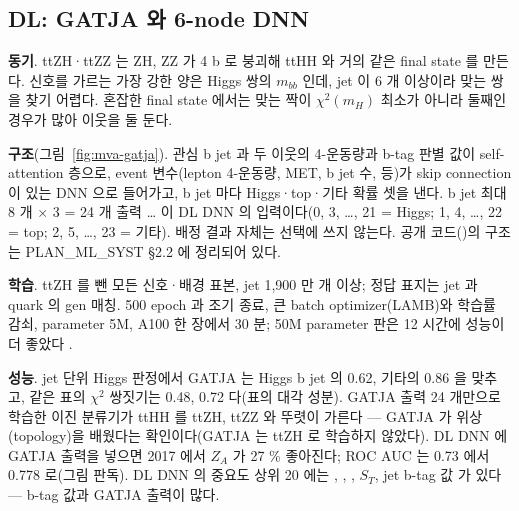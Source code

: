 \subsection{DL: GATJA 와 6-node DNN}\label{sec:mva-an-gatja}

\textbf{동기}. ttZH·ttZZ 는 ZH, ZZ 가 4 b 로 붕괴해 ttHH 와 거의 같은 final state 를 만든다. 신호를 가르는 가장 강한 양은 Higgs 쌍의
$m_{bb}$ 인데, jet 이 6 개 이상이라 맞는 쌍을 찾기 어렵다. 혼잡한 final state 에서는 맞는 짝이 $\chi^2(m_H)$ 최소가
아니라 둘째인 경우가 많아 이웃을 둘 둔다.

\textbf{구조}(그림~\ref{fig:mva-gatja}). 관심 b jet 과 두 이웃의 4-운동량과 b-tag 판별 값이 self-attention 층으로, event 변수(lepton 4-운동량, MET,
b jet 수, \HT 등)가 skip connection 이 있는 DNN 으로 들어가고, b jet 마다 Higgs·top·기타 확률 셋을 낸다.
b jet 최대 8 개 $\times$ 3 = 24 개 출력  …  이 DL DNN 의 입력이다(0, 3, …, 21 = Higgs; 1, 4, …, 22 = top;
2, 5, …, 23 = 기타). 배정 결과 자체는 선택에 쓰지 않는다.
공개 코드()의 구조는 PLAN\_ML\_SYST §2.2 에 정리되어 있다.

\textbf{학습}. ttZH 를 뺀 모든 신호·배경 표본, jet 1{,}900 만 개 이상; 정답 표지는 jet 과 quark 의 gen 매칭.
500 epoch 과 조기 종료, 큰 batch optimizer(LAMB)와 학습률 감쇠, parameter 5M, A100 한 장에서 30 분; 50M parameter 판은 12 시간에 성능이 더 좋았다
.

\textbf{성능}. jet 단위 Higgs 판정에서 GATJA 는 Higgs b jet 의 0.62, 기타의 0.86 을 맞추고, 같은 표의 $\chi^2$ 쌍짓기는 0.48, 0.72 다(표의 대각
성분). GATJA 출력 24 개만으로 학습한 이진 분류기가 ttHH 를 ttZH, ttZZ 와 뚜렷이 가른다 — GATJA 가 위상(topology)을 배웠다는
확인이다(GATJA 는 ttZH 로 학습하지 않았다). DL DNN 에 GATJA 출력을 넣으면
2017 에서 $Z_A$ 가 27 \% 좋아진다; ROC AUC 는 0.73 에서 0.778 로(그림 판독).
DL DNN 의 중요도 상위 20 에는 , , , $S_T$, jet b-tag 값  가 있다
 — b-tag 값과 GATJA 출력이 많다.

